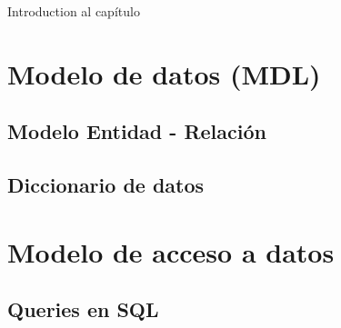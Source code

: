 Introduction al capítulo

\section{Modelo de datos (MDL)}

\subsection{Modelo Entidad - Relación}

\subsection{Diccionario de datos}

\section{Modelo de acceso a datos}

\subsection{Queries en SQL}